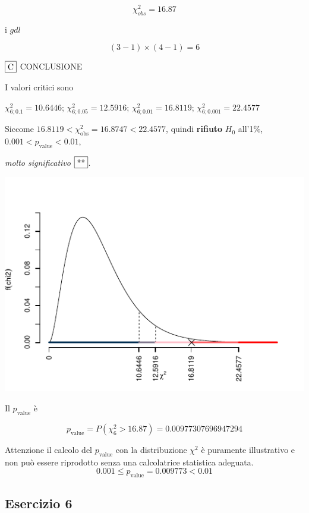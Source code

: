 \documentclass[
  11pt,
]{book}
\theoremstyle{mytheoremstyle}
\theoremstyle{mydefstyle}
\newenvironment{sol}
  {
  \begin{tcolorbox}[enhanced,breakable,arc=0.1mm,boxrule=1pt,colback=white,colframe=iblue,
  title=\bf \fontfamily{lmss}\selectfont \hspace{.5 cm} Soluzione,drop fuzzy shadow]

}{
\end{tcolorbox}
  }
\begin{document}
\begin{sol}
\[
    \chi^2_{obs}= 16.87 
  \]

i \(gdl\)

\[
    ( 3 -1)\times( 4 -1)= 6 
  \]

\(\fbox{C}\) CONCLUSIONE

I valori critici sono

\(\chi^2_{6;0.1}=10.6446\); \(\chi^2_{6;0.05}=12.5916\); \(\chi^2_{6;0.01}=16.8119\); \(\chi^2_{6;0.001}=22.4577\)

Siccome \(16.8119<\chi^2_\text{obs}=16.8747<22.4577\), quindi \textbf{rifiuto} \(H_0\) all'1\%, \(0.001<p_\text{value}<0.01\),

\emph{molto significativo} \(\fbox{**}\).

\begin{center}\includegraphics{Esami_passati_con_soluzioni_files/figure-latex/2021-21,-1} \end{center}

Il \(p_{\text{value}}\) è

\[ p_{\text{value}} = P(\chi^2_{6}>16.87)=0.00977307696947294 \]

Attenzione il calcolo del \(p_\text{value}\) con la distribuzione \(\chi^2\) è puramente illustrativo e non può essere riprodotto senza una calcolatrice statistica adeguata.\[
 0.001 \leq p_\text{value}= 0.009773 < 0.01 
\]

\end{sol}

\subsection{Esercizio 6}\label{esercizio-6-4}
\end{document}
